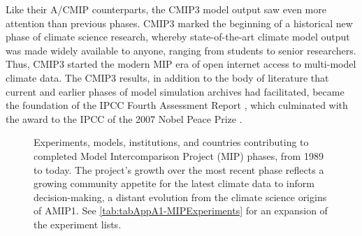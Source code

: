 \documentclass[manuscript]{copernicus}
\newcommand{\mycomment}[1]{}
\begin{document}
Like their A/CMIP counterparts, the CMIP3 model output saw even more attention than previous phases. CMIP3 marked the beginning of a historical new phase of climate science research, whereby state-of-the-art climate model output was made widely available to anyone, ranging from students to senior researchers. Thus, CMIP3 started the modern MIP era of open internet access to multi-model climate data. The CMIP3 results, in addition to the body of literature that current and earlier phases of model simulation archives had facilitated, became the foundation of the IPCC Fourth Assessment Report \citep[AR4;][]{meehl_global_2007,randall_climate_2007}, which culminated with the award to the IPCC of the 2007 Nobel Peace Prize \citep{kerr_nobel_2007}.

\mycomment{
CLIVAR MIPs list circa 2005 - lots ~30
http://web.archive.org/web/20050319232556/http://www.clivar.org/science/mips.htm
This omits the CMIP Coordinated Experiment focus which were all announced in 2002 - https://web.archive.org/web/20040827091054/http://www-pcmdi.llnl.gov/cmip/ - subsequently known as CMIP3
Also https://pcmdi.llnl.gov/mips/cmip/ann_20c3m.html
Also PCMDI provided disks to modelling groups who copied data and posted them back - Meehl et al., 2003
Meehl & Hibbard, 2007: A STRATEGY FOR CLIMATE CHANGE STABILIZATION EXPERIMENTS WITH AOGCMs AND ESMs https://www.agci.org/wp-content/uploads/imported-files/2022/07/06S1_WhitePaper.pdf
C4MIP ~2002 https://web.archive.org/web/20040804013119/http://www.c4mip.cnrs-gif.fr/protocol.html
}


\begin{figure}
    \centering
    
    \caption{Experiments, models, institutions, and countries contributing to completed Model Intercomparison Project (MIP) phases, from 1989 to today. The project's growth over the most recent phase reflects a growing community appetite for the latest climate data to inform decision-making, a distant evolution from the climate science origins of AMIP1. See \autoref{tab:tabAppA1-MIPExperiments} for an expansion of the experiment lists.}
    \label{fig:fig1-MIPGrowth}
\end{figure}
\end{document}
